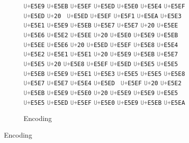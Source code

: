 \documentclass[letterpaper]{article}
\newcommand{\codepoint}[1]{{\tt\textcolor{gray}{U+}#1}}
\begin{document}
\begin{figure}
  \centering
  \caption{}
  \begin{subfigure}{1\textwidth}
    \centering
    \caption{Encoding}
      \codepoint{E5E9} \codepoint{E5EB} \codepoint{E5EF} \codepoint{E5ED} \codepoint{E5E0} \codepoint{E5E4} \codepoint{E5EF} \codepoint{E5ED} \codepoint{20 } \codepoint{E5ED} \codepoint{E5EF} \codepoint{E5F1} \codepoint{E5EA} \codepoint{E5E3 } \codepoint{E5E1} \codepoint{E5E9} \codepoint{E5EB} \codepoint{E5E7} \codepoint{E5E7} \codepoint{20} \codepoint{E5EE} \codepoint{E5E6} \codepoint{E5E2} \codepoint{E5EE} \codepoint{20} \codepoint{E5E0} \codepoint{E5E9} \codepoint{E5EB} \codepoint{E5EE} \codepoint{E5E6} \codepoint{20} \codepoint{E5ED} \codepoint{E5EF} \codepoint{E5E8} \codepoint{E5E4} \codepoint{E5E2} \codepoint{E5E1} \codepoint{E5E1} \codepoint{20} \codepoint{E5E9} \codepoint{E5EB} \codepoint{E5E7} \codepoint{E5E5} \codepoint{20} \codepoint{E5E8} \codepoint{E5EF} \codepoint{E5ED} \codepoint{E5E5} \codepoint{E5E5} \codepoint{E5EB} \codepoint{E5E9} \codepoint{E5E1} \codepoint{E5E3} \codepoint{E5E5} \codepoint{E5E5} \codepoint{E5E8} \codepoint{E5E7} \codepoint{E5E7} \codepoint{E5E4} \codepoint{E5ED } \codepoint{E5EF} \codepoint{20} \codepoint{E5E2} \codepoint{E5EB} \codepoint{E5E9} \codepoint{E5E0} \codepoint{20} \codepoint{E5E9} \codepoint{E5E9} \codepoint{E5E5} \codepoint{E5E5} \codepoint{E5ED} \codepoint{E5EF} \codepoint{E5E0} \codepoint{E5E9} \codepoint{E5EB} \codepoint{E5EA}

  \end{subfigure}
  
  \medskip
  

\end{figure}
\end{document}
